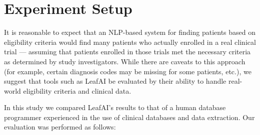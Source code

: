 \documentclass[../main.tex]{subfiles}
\begin{document}
\section{Experiment Setup}

It is reasonable to expect that an NLP-based system for finding patients based on eligibility criteria would find many  patients who actually enrolled in a real clinical trial — assuming  that patients enrolled in those trials met the necessary criteria as determined by study investigators. While there are caveats to this approach (for example, certain diagnosis codes may be missing for some patients, etc.), we suggest that tools such as LeafAI be evaluated by their ability to handle real-world eligibility criteria and clinical data. 

In this study we compared LeafAI's results to that of a human database programmer experienced in the use of clinical databases and data extraction. Our evaluation was performed as follows:
\end{document}
